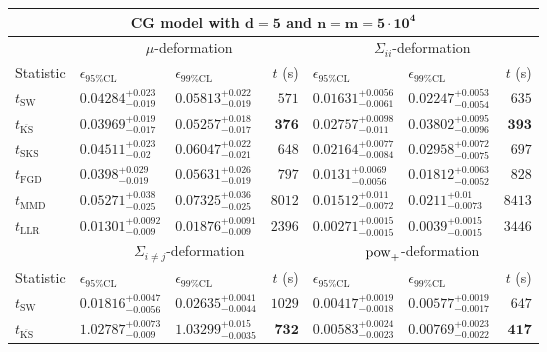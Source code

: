 \begin{tabular}{l|llr|llr}
	\toprule
	\multicolumn{7}{c}{{\bf CG model with $\mathbf{d=5}$ and $\mathbf{n=m=5\cdot 10^{4}}$}} \\
	\toprule
	\multicolumn{1}{c}{} & \multicolumn{3}{c}{$\mu$-deformation} & \multicolumn{3}{c}{$\Sigma_{ii}$-deformation} \\
	Statistic & $\epsilon_{95\%\mathrm{CL}}$ & $\epsilon_{99\%\mathrm{CL}}$ & $t$ (s) & $\epsilon_{95\%\mathrm{CL}}$ & $\epsilon_{99\%\mathrm{CL}}$ & $t$ (s) \\
	\midrule
	$t_{\mathrm{SW}}$ & $0.04284_{-0.019}^{+0.023}$ & $0.05813_{-0.019}^{+0.022}$ & $571$ & $0.01631_{-0.0061}^{+0.0056}$ & $0.02247_{-0.0054}^{+0.0053}$ & $635$ \\
	$t_{\overline{\mathrm{KS}}}$ & ${\mathbf{0.03969_{-0.017}^{+0.019}}}$ & ${\mathbf{0.05257_{-0.017}^{+0.018}}}$ & ${\mathbf{376}}$ & $0.02757_{-0.011}^{+0.0098}$ & $0.03802_{-0.0096}^{+0.0095}$ & ${\mathbf{393}}$ \\
	$t_{\mathrm{SKS}}$ & $0.04511_{-0.02}^{+0.023}$ & $0.06047_{-0.021}^{+0.022}$ & $648$ & $0.02164_{-0.0084}^{+0.0077}$ & $0.02958_{-0.0075}^{+0.0072}$ & $697$ \\
	$t_{\mathrm{FGD}}$ & $0.0398_{-0.019}^{+0.029}$ & $0.05631_{-0.019}^{+0.026}$ & $797$ & ${\mathbf{0.0131_{-0.0056}^{+0.0069}}}$ & ${\mathbf{0.01812_{-0.0052}^{+0.0063}}}$ & $828$ \\
	$t_{\mathrm{MMD}}$ & $0.05271_{-0.025}^{+0.038}$ & $0.07325_{-0.025}^{+0.036}$ & $8012$ & $0.01512_{-0.0072}^{+0.011}$ & $0.0211_{-0.0073}^{+0.01}$ & $8413$ \\
	$t_{\mathrm{LLR}}$ & $0.01301_{-0.009}^{+0.0092}$ & $0.01876_{-0.009}^{+0.0091}$ & $2396$ & $0.00271_{-0.0015}^{+0.0015}$ & $0.0039_{-0.0015}^{+0.0015}$ & $3446$ \\
	\toprule
	\multicolumn{1}{c}{} & \multicolumn{3}{c}{$\Sigma_{i\neq j}$-deformation} & \multicolumn{3}{c}{$\rm{pow}_{+}$-deformation} \\
	Statistic & $\epsilon_{95\%\mathrm{CL}}$ & $\epsilon_{99\%\mathrm{CL}}$ & $t$ (s) & $\epsilon_{95\%\mathrm{CL}}$ & $\epsilon_{99\%\mathrm{CL}}$ & $t$ (s) \\
	\midrule
	$t_{\mathrm{SW}}$ & $0.01816_{-0.0056}^{+0.0047}$ & $0.02635_{-0.0044}^{+0.0041}$ & $1029$ & $0.00417_{-0.0018}^{+0.0019}$ & $0.00577_{-0.0017}^{+0.0019}$ & $647$ \\
	$t_{\overline{\mathrm{KS}}}$ & $1.02787_{-0.009}^{+0.0073}$ & $1.03299_{-0.0035}^{+0.015}$ & ${\mathbf{732}}$ & $0.00583_{-0.0023}^{+0.0024}$ & $0.00769_{-0.0022}^{+0.0023}$ & ${\mathbf{417}}$ \\

\end{tabular}
